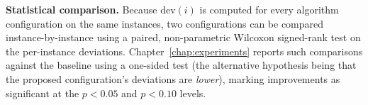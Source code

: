 \textbf{Statistical comparison.} Because $\mathrm{dev}(i)$ is computed for
every algorithm configuration on the same instances, two configurations can
be compared instance-by-instance using a paired, non-parametric Wilcoxon
signed-rank test on the per-instance deviations. Chapter~\ref{chap:experiments}
reports such comparisons against the baseline using a one-sided test (the
alternative hypothesis being that the proposed configuration's deviations are
\emph{lower}), marking improvements as significant at the $p<0.05$ and
$p<0.10$ levels.
